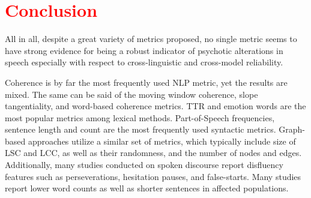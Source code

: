 \begin{table}[h]
\captionsetup{width=\textwidth}
\caption[Comparison of graph-based, syntactic, and language model-based methods.]{\label{tab:comparison:Graph-Synt-LM} Comparison between graph-based (Graph), syntactic (Synt), and language model-based methods (LM). 
\\ ``+'' indicates significant group difference or correlation for most metrics tested within the group. ``?'' indicates mixed results with some metrics showing significant results but not others. ``!'' indicates absence of significant differences in the metrics tested. The studies on clinical high risk populations are shown in italics.}
\end{table}


\section{\textcolor{red}{Conclusion}}
\label{sec:review:summary}

All in all, despite a great variety of metrics proposed, no single metric seems to have strong evidence for being a robust indicator of psychotic alterations in speech especially with respect to cross-linguistic and cross-model reliability. 


Coherence is by far the most frequently used NLP metric, yet the results are mixed. The same can be said of the moving window coherence, slope tangentiality, and word-based coherence metrics.  TTR and emotion words are the most popular metrics among lexical methods. Part-of-Speech frequencies, sentence length and count are the most frequently used syntactic metrics. Graph-based approaches utilize a similar set of metrics, which typically include size of LSC and LCC, as well as their randomness, and the number of nodes and edges. Additionally, many studies conducted on spoken discourse report disfluency features such as perseverations, hesitation pauses, and false-starts. Many studies report lower word counts as well as shorter sentences in affected populations.


